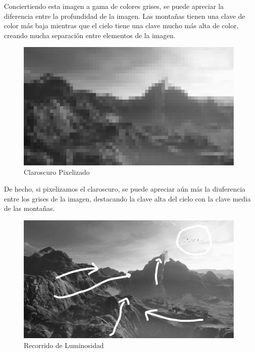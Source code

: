 \documentclass[12pt]{article}
\begin{document}
          Conciertiendo esta imagen a gama de colores grises, se puede apreciar la diferencia entre la profundidad de la imagen. 
          Las montañas tienen una clave de color más baja mientras que el cielo tiene una clave mucho más alta de color, creando mucha separación entre elementos de la imagen. 

          \begin{figure}[H]
            \centering
            \includegraphics[scale = 0.2]{Jesus/Seccion16/pixelart.jpg}
            \caption{Claroscuro Pixelizado}
          \end{figure}

          De hecho, si pixelizamos el claroscuro, se puede apreciar aún más la diuferencia entre los grises de la imagen, destacando la clave alta del cielo con la clave media de las montañas.

          \begin{figure}[H]
            \centering
            \includegraphics[scale = 0.2]{images/Jesus/Seccion16/recorrido luz.jpg}
            \caption{Recorrido de Luminosidad}
          \end{figure}  
\end{document}
